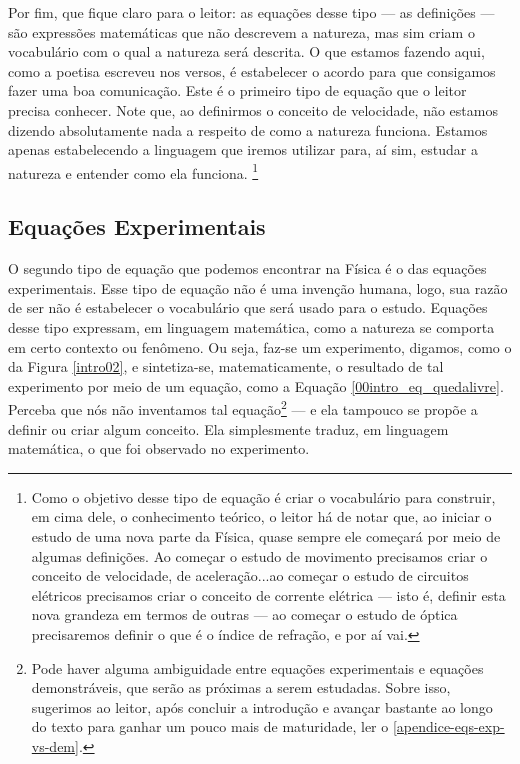 Por fim, que fique claro para o leitor: as equações desse tipo --- as definições --- são expressões matemáticas que não descrevem a natureza, mas sim criam o vocabulário com o qual a natureza será descrita. O que estamos fazendo aqui, como a poetisa escreveu nos versos, é estabelecer o acordo para que consigamos fazer uma boa comunicação. Este é o primeiro tipo de equação que o leitor precisa conhecer. Note que, ao definirmos o conceito de velocidade, não estamos dizendo absolutamente nada a respeito de como a natureza funciona. Estamos apenas estabelecendo a linguagem que iremos utilizar para, aí sim, estudar a natureza e entender como ela funciona. \footnote{Como o objetivo desse tipo de equação é criar o vocabulário para construir, em cima dele, o conhecimento teórico, o leitor há de notar que, ao iniciar o estudo de uma nova parte da Física, quase sempre ele começará por meio de algumas definições. Ao começar o estudo de movimento precisamos criar o conceito de velocidade, de aceleração...ao começar o estudo de circuitos elétricos precisamos criar o conceito de corrente elétrica --- isto é, definir esta nova grandeza em termos de outras --- ao começar o estudo de óptica precisaremos definir o que é o índice de refração, e por aí vai. }




\subsection{Equações Experimentais}

O segundo tipo de equação que podemos encontrar na Física é o das equações experimentais. Esse tipo de equação não é uma invenção humana, logo, sua razão de ser não é estabelecer o vocabulário que será usado para o estudo. Equações desse tipo expressam, em linguagem matemática, como a natureza se comporta em certo contexto ou fenômeno. Ou seja, faz-se um experimento, digamos, como o da Figura \ref{intro02}, e sintetiza-se, matematicamente, o resultado de tal experimento por meio de um equação, como a Equação \eqref{00intro_eq_quedalivre}. Perceba que nós não inventamos tal equação\footnote{Pode haver alguma ambiguidade entre equações experimentais e equações demonstráveis, que serão as próximas a serem estudadas. Sobre isso, sugerimos ao leitor, após concluir a introdução e avançar bastante ao longo do texto para ganhar um pouco mais de maturidade, ler o \autoref{apendice-eqs-exp-vs-dem}.} --- e ela tampouco se propõe a definir ou criar algum conceito. Ela simplesmente traduz, em linguagem matemática, o que foi observado no experimento.

